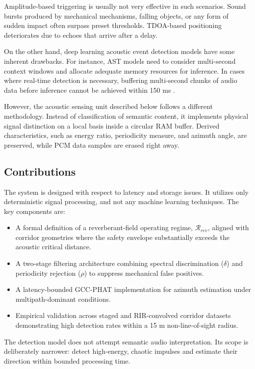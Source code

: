 \documentclass[conference]{IEEEtran}
\begin{document}
Amplitude-based triggering is usually not very effective in such scenarios. Sound bursts produced by mechanical mechanisms, falling objects, or any form of sudden impact often surpass preset thresholds. TDOA-based positioning deteriorates due to echoes that arrive after a delay.

On the other hand, deep learning acoustic event detection models have some inherent drawbacks. For instance, AST models need to consider multi-second context windows and allocate adequate memory resources for inference. In cases where real-time detection is necessary, buffering multi-second chunks of audio data before inference cannot be achieved within 150 ms \cite{b26}.

However, the acoustic sensing unit described below follows a different methodology. Instead of classification of semantic content, it implements physical signal distinction on a local basis inside a circular RAM buffer. Derived characteristics, such as energy ratio, periodicity measure, and azimuth angle, are preserved, while PCM data samples are erased right away.

\subsection{Contributions}
The system is designed with respect to latency and storage issues. It utilizes only deterministic signal processing, and not any machine learning techniques. The key components are:
\begin{itemize}
    \item A formal definition of a reverberant-field operating regime, $\mathcal{R}_{rev}$, aligned with corridor geometries where the safety envelope substantially exceeds the acoustic critical distance.
    \item A two-stage filtering architecture combining spectral discrimination ($\delta$) and periodicity rejection ($\rho$) to suppress mechanical false positives.
    \item A latency-bounded GCC-PHAT implementation for azimuth estimation under multipath-dominant conditions.
    \item Empirical validation across staged and RIR-convolved corridor datasets demonstrating high detection rates within a 15 m non-line-of-sight radius.
\end{itemize}

The detection model does not attempt semantic audio interpretation. Its scope is deliberately narrower: detect high-energy, chaotic impulses and estimate their direction within bounded processing time.
\end{document}
